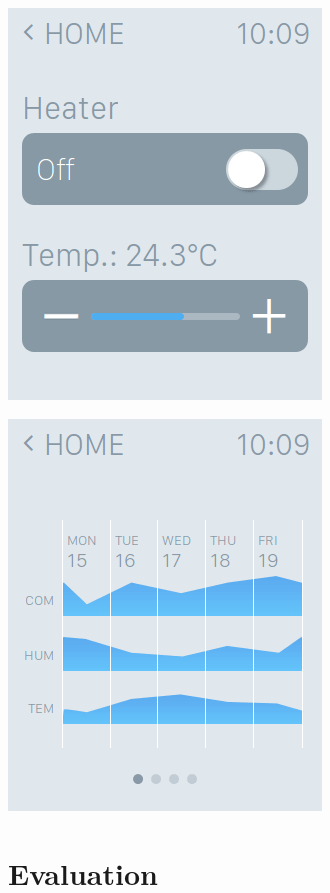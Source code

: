 \documentclass[a4paper,10pt]{article}
\begin{document}
\includegraphics[scale=0.4]{images/temperature.png}

\includegraphics[scale=0.4]{images/history.png}

\section{Evaluation}
\end{document}
